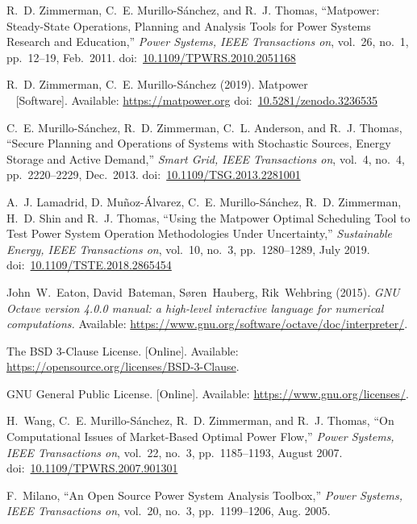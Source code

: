 \documentclass[12pt]{article}
\newcommand{\matpower}[0]{{\sc Matpower}}
\newcommand{\doi}[1]{doi:~\href{https://doi.org/#1}{#1}}
\numberwithin{equation}{section}
\numberwithin{table}{section}
\numberwithin{figure}{section}
\begin{document}
\clearpage
\begin{thebibliography}{99}

R.~D. Zimmerman, C.~E. Murillo-S{\'a}nchez, and R.~J. Thomas, ``\matpower{}: Steady-State Operations, Planning and Analysis Tools for Power Systems Research and Education,'' \emph{Power Systems, IEEE Transactions on}, vol.~26, no.~1, pp.~12--19, Feb.~2011.
\doi{10.1109/TPWRS.2010.2051168}

R.~D. Zimmerman, C.~E. Murillo-S{\'a}nchez (2019). \matpower{}\\~
[Software]. Available: \url{https://matpower.org}
\doi{10.5281/zenodo.3236535}

C.~E. Murillo-S{\'a}nchez, R.~D. Zimmerman, C.~L. Anderson, and R.~J. Thomas, ``Secure Planning and Operations of Systems with Stochastic Sources, Energy Storage and Active Demand,'' \emph{Smart Grid, IEEE Transactions on}, vol.~4, no.~4, pp.~2220--2229, Dec.~2013.
\doi{10.1109/TSG.2013.2281001}

A.~J. Lamadrid, D. Mu{\~n}oz-{\'A}lvarez, C.~E. Murillo-S{\'a}nchez, R.~D. Zimmerman, H.~D. Shin and R.~J. Thomas, ``Using the \matpower{} Optimal Scheduling Tool to Test Power System Operation Methodologies Under Uncertainty,'' \emph{Sustainable Energy, IEEE Transactions on}, vol.~10, no.~3, pp.~1280--1289, July 2019.
\doi{10.1109/TSTE.2018.2865454}

John~W.~Eaton, David~Bateman, S{\o}ren~Hauberg, Rik~Wehbring (2015). \emph{GNU Octave version 4.0.0 manual: a high-level interactive language for numerical computations.} Available: \url{https://www.gnu.org/software/octave/doc/interpreter/}.

The BSD 3-Clause License. [Online]. Available: \url{https://opensource.org/licenses/BSD-3-Clause}.

GNU General Public License. [Online]. Available: \url{https://www.gnu.org/licenses/}.

H.~Wang, C.~E. Murillo-S{\'a}nchez, R.~D. Zimmerman, and R.~J. Thomas, ``On
Computational Issues of Market-Based Optimal Power Flow,'' \emph{Power
Systems, IEEE Transactions on}, vol.~22, no.~3, pp.~1185--1193, August 2007.
\doi{10.1109/TPWRS.2007.901301}

F.~Milano, ``An Open Source Power System Analysis Toolbox,'' \emph{Power
  Systems, IEEE Transactions on}, vol.~20, no.~3, pp.~1199--1206, Aug. 2005.


\end{thebibliography}
\end{document}
